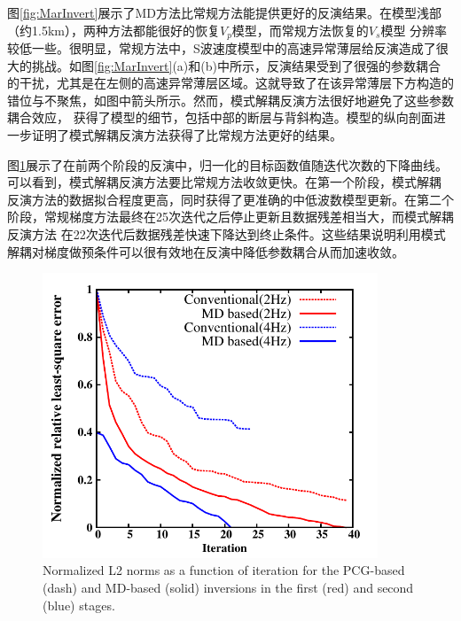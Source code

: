 图\ref{fig:MarInvert}展示了MD方法比常规方法能提供更好的反演结果。在模型浅部（约1.5km），两种方法都能很好的恢复$V_p$模型，而常规方法恢复的$V_s$模型
分辨率较低一些。很明显，常规方法中，S波速度模型中的高速异常薄层给反演造成了很大的挑战。如图\ref{fig:MarInvert}(a)和(b)中所示，反演结果受到了很强的参数耦合
的干扰，尤其是在左侧的高速异常薄层区域。这就导致了在该异常薄层下方构造的错位与不聚焦，如图中箭头所示。然而，模式解耦反演方法很好地避免了这些参数耦合效应，
获得了模型的细节，包括中部的断层与背斜构造。模型的纵向剖面进一步证明了模式解耦反演方法获得了比常规方法更好的结果。

图\ref{fig:L2}展示了在前两个阶段的反演中，归一化的目标函数值随迭代次数的下降曲线。可以看到，模式解耦反演方法要比常规方法收敛更快。在第一个阶段，模式解耦
反演方法的数据拟合程度更高，同时获得了更准确的中低波数模型更新。在第二个阶段，常规梯度方法最终在25次迭代之后停止更新且数据残差相当大，而模式解耦反演方法
在22次迭代后数据残差快速下降达到终止条件。这些结果说明利用模式解耦对梯度做预条件可以很有效地在反演中降低参数耦合从而加速收敛。
\begin{figure}
    \begin{center}
        \includegraphics[width=10cm]{Figure/chapter02/tariqsugresult/Fig/L2.pdf}
        \caption{
            Normalized L2 norms as a function of iteration for the PCG-based (dash)
            and MD-based (solid) inversions in the first (red) and second (blue)
            stages.
    }
    \label{fig:L2}
    \end{center}
\end{figure}
